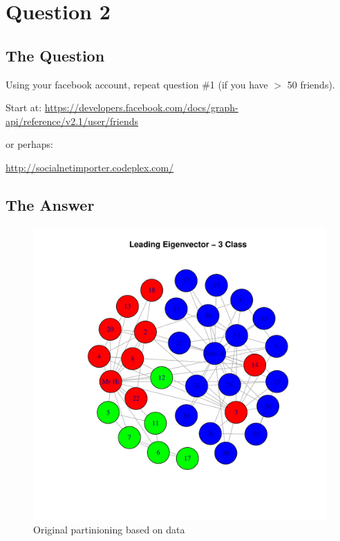 \section{Question 2}

\subsection{The Question}

 Using your facebook account, repeat question \#1 (if you have $> $
50 friends).

Start at: \url{https://developers.facebook.com/docs/graph-api/reference/v2.1/user/friends}

or perhaps:

\url{http://socialnetimporter.codeplex.com/}

\subsection{The Answer}



\begin{figure}[H]
\centering 
\includegraphics[width=.8\textwidth]{../Rplots3.pdf}
\caption{Original partinioning based on data}
\end{figure}

